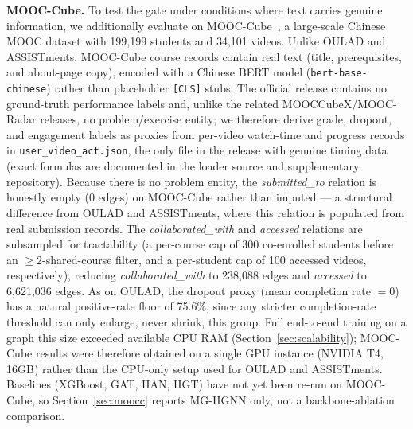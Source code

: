 \documentclass[sigconf,review]{acmart}
\begin{document}
\textbf{MOOC-Cube.} To test the gate under conditions
where text carries genuine information, we additionally
evaluate on MOOC-Cube~\citep{yu2020mooccube}, a
large-scale Chinese MOOC dataset with 199,199 students
and 34,101 videos. Unlike OULAD and ASSISTments,
MOOC-Cube course records contain real text (title,
prerequisites, and about-page copy), encoded with a
Chinese BERT model (\texttt{bert-base-chinese}) rather
than placeholder \texttt{[CLS]} stubs. The official
release contains no ground-truth performance labels
and, unlike the related MOOCCubeX/MOOC-Radar releases,
no problem/exercise entity; we therefore derive grade,
dropout, and engagement labels as proxies from
per-video watch-time and progress records in
\texttt{user\_video\_act.json}, the only file in the
release with genuine timing data (exact formulas are
documented in the loader source and supplementary
repository). Because there is no problem entity, the
\textit{submitted\_to} relation is honestly empty
(0 edges) on MOOC-Cube rather than imputed --- a
structural difference from OULAD and ASSISTments,
where this relation is populated from real submission
records. The \textit{collaborated\_with} and
\textit{accessed} relations are subsampled for
tractability (a per-course cap of 300 co-enrolled
students before an ${\geq}2$-shared-course filter, and
a per-student cap of 100 accessed videos, respectively),
reducing \textit{collaborated\_with} to 238,088 edges
and \textit{accessed} to 6,621,036 edges. As on OULAD,
the dropout proxy (mean completion rate $=0$) has a
natural positive-rate floor of 75.6\%, since any
stricter completion-rate threshold can only enlarge,
never shrink, this group. Full end-to-end training on
a graph this size exceeded available CPU RAM
(Section~\ref{sec:scalability}); MOOC-Cube results
were therefore obtained on a single GPU instance
(NVIDIA T4, 16GB) rather than the CPU-only setup used
for OULAD and ASSISTments. Baselines (XGBoost, GAT,
HAN, HGT) have not yet been re-run on MOOC-Cube, so
Section~\ref{sec:moocc} reports MG-HGNN only, not a
backbone-ablation comparison.
\end{document}
